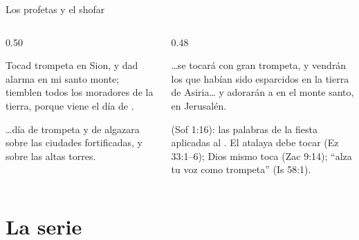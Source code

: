 \begin{frame}{Los profetas y el shofar}
\begin{columns}[t,onlytextwidth]
\begin{column}{0.50\textwidth}
\begin{cita}Tocad trompeta en Sion, y dad alarma en mi santo monte; tiemblen todos los moradores de la tierra, porque viene el día de \SENOR.\end{cita}
\begin{cita}\ldots{}día de trompeta y de algazara sobre las ciudades fortificadas, y sobre las altas torres.\end{cita}
\end{column}
\begin{column}{0.48\textwidth}
\begin{cita}\ldots{}se tocará con gran trompeta, y vendrán los que habían sido esparcidos en la tierra de Asiria\ldots{} y adorarán a \SENOR{} en el monte santo, en Jerusalén.\end{cita}
\scriptsize\RaggedRight {} (Sof 1:16): las palabras de la fiesta aplicadas al . El atalaya debe tocar (Ez 33:1--6); Dios mismo toca (Zac 9:14); ``alza tu voz como trompeta'' (Is 58:1).
\end{column}
\end{columns}
\end{frame}

\section{La serie}

